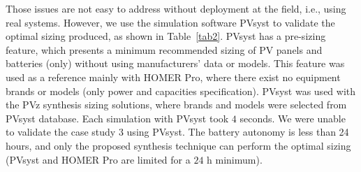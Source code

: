 \documentclass[journal]{IEEEtran}
\begin{document}
Those issues are not easy to address without deployment at the field, i.e., using real systems. However, we use the simulation software PVsyst to validate the optimal sizing produced, as shown in Table~\ref{tab2}. PVsyst has a pre-sizing feature, which presents a minimum recommended sizing of PV panels and batteries (only) without using manufacturers' data or models. This feature was used as a reference mainly with HOMER Pro, where there exist no equipment brands or models (only power and capacities specification). PVsyst was used with the PVz synthesis sizing solutions, where brands and models were selected from PVsyst database. Each simulation with PVsyst took $4$ seconds. We were unable to validate the case study $3$ using PVsyst. The battery autonomy is less than 24 hours, and only the proposed synthesis technique can perform the optimal sizing (PVsyst and HOMER Pro are limited for a $24$ h minimum).
%
\end{document}

